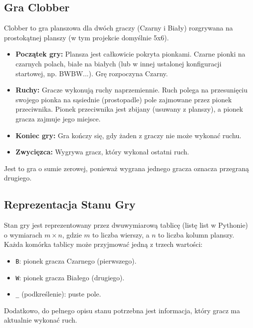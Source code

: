 \documentclass[11pt,a4paper]{article}
\newcommand{\code}[1]{\texttt{#1}} %
\begin{document}
\subsection{Gra Clobber}
Clobber to gra planszowa dla dwóch graczy (Czarny i Biały) rozgrywana na prostokątnej planszy (w tym projekcie domyślnie 5x6).
\begin{itemize}
    \item \textbf{Początek gry:} Plansza jest całkowicie pokryta pionkami. Czarne pionki na czarnych polach, białe na białych (lub w innej ustalonej konfiguracji startowej, np. BWBW...). Grę rozpoczyna Czarny.
    \item \textbf{Ruchy:} Gracze wykonują ruchy naprzemiennie. Ruch polega na przesunięciu swojego pionka na sąsiednie (prostopadle) pole zajmowane przez pionek przeciwnika. Pionek przeciwnika jest zbijany (usuwany z planszy), a pionek gracza zajmuje jego miejsce.
    \item \textbf{Koniec gry:} Gra kończy się, gdy żaden z graczy nie może wykonać ruchu.
    \item \textbf{Zwycięzca:} Wygrywa gracz, który wykonał ostatni ruch.
\end{itemize}
Jest to gra o sumie zerowej, ponieważ wygrana jednego gracza oznacza przegraną drugiego.

\subsection{Reprezentacja Stanu Gry}
Stan gry jest reprezentowany przez dwuwymiarową tablicę (listę list w Pythonie) o wymiarach $m \times n$, gdzie $m$ to liczba wierszy, a $n$ to liczba kolumn planszy. Każda komórka tablicy może przyjmować jedną z trzech wartości:
\begin{itemize}
    \item \code{B}: pionek gracza Czarnego (pierwszego).
    \item \code{W}: pionek gracza Białego (drugiego).
    \item \code{\_} (podkreślenie): puste pole. %
\end{itemize}
Dodatkowo, do pełnego opisu stanu potrzebna jest informacja, który gracz ma aktualnie wykonać ruch.
\end{document}
